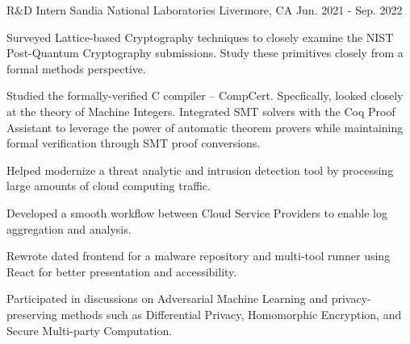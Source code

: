 

\begin{cventries}

  \cventry
    {R\&D Intern} %
    {Sandia National Laboratories} %
    {Livermore, CA} %
    {Jun. 2021 - Sep. 2022} %
    {
      \begin{cvitems} %
        \item{Surveyed Lattice-based Cryptography techniques to closely examine the NIST Post-Quantum Cryptography submissions. Study these primitives closely from a formal methods perspective.}
        \item{Studied the formally-verified C compiler -- CompCert. Specfically, looked closely at the theory of Machine Integers. Integrated SMT solvers with the Coq Proof Assistant to leverage the power of automatic theorem provers while maintaining formal verification through SMT proof conversions. }
        \item{Helped modernize a threat analytic and intrusion detection tool by processing large amounts of cloud computing traffic.}
        \item{Developed a smooth workflow between Cloud Service Providers to enable log aggregation and analysis.}
        \item{Rewrote dated frontend for a malware repository and multi-tool runner using React for better presentation and accessibility.}
        \item{Participated in discussions on Adversarial Machine Learning and privacy-preserving methods such as Differential Privacy, Homomorphic Encryption, and Secure Multi-party Computation.}
      \end{cvitems}
    }


\end{cventries}
